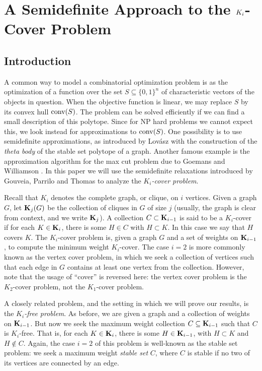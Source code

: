\chapter{A Semidefinite Approach to the $K_\MakeLowercase{i}$-Cover Problem}
\label{chap:kicover}


\section{Introduction}
A common way to model a combinatorial optimization problem is as the optimization of a function over the set $S \subseteq \{0,1\}^n$ of  characteristic vectors of the objects in question. When the objective function is linear, 
we may replace $S$ by its convex hull $\hbox{conv}(S)$. The problem can be solved efficiently if we can find a small description of this polytope. Since for NP hard problems we cannot expect this, we look instead for  approximations to $\hbox{conv}(S)$. One possibility is to use semidefinite approximations, as introduced by Lov\'{a}sz \cite{lovasz} with the construction of the {\em theta body} of the stable set polytope of a graph. Another famous example is the approximation algorithm for the max cut problem due to Goemans and Williamson \cite{goemans_williamson}. In this paper we will use the semidefinite relaxations introduced by Gouveia, Parrilo and Thomas \cite{gpt} to analyze the {\em $K_i$-cover problem}.

Recall that $K_i$ denotes the complete graph, or clique, on $i$ vertices. Given a graph $G$, let $\mathbf{K}_j(G)$ be the collection of cliques in $G$ of size $j$ (usually, the graph is clear from context, and we write $\mathbf{K}_j$). A collection $C \subset \mathbf{K}_{i-1}$ is said to be a $K_i$-cover if for each $K \in \mathbf{K}_i$, there is some $H \in C$ with $H \subset K$. In this case we say that $H$ covers $K$. The $K_i$-cover problem is, given a graph $G$ and a set of weights on $\mathbf{K}_{i-1}$, to compute the minimum weight $K_i$-cover. The case $i=2$ is more commonly known as the vertex cover problem, in which we seek a collection of vertices such that each edge in $G$ contains at least one vertex from the collection. However, note that the usage of ``cover'' is reversed here: the vertex cover problem is the $K_2$-cover problem, not the $K_1$-cover problem.

A closely related problem, and the setting in which we will prove our results, is the {\em $K_i$-free problem}. As before, we are given a graph and a collection of weights on $\mathbf{K}_{i-1}$. But now we seek the maximum weight collection $C \subseteq \mathbf{K}_{i-1}$ such that $C$ is $K_i$-free. That is, for each $K \in \mathbf{K}_i$, there is some $H \in \mathbf{K}_{i-1}$, with $H \subset K$ and $H \notin C$. Again, the case $i=2$ of this problem is well-known as the stable set problem: we seek a maximum weight {\em stable set} $C$, where $C$ is stable if no two of its vertices are connected by an edge.

